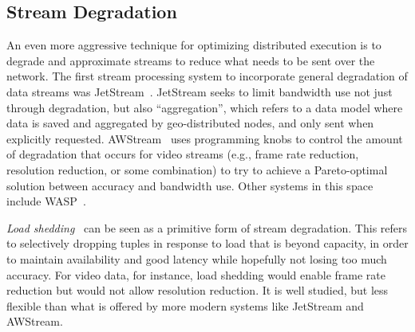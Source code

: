 \subsection{Stream Degradation}

An even more aggressive technique for optimizing distributed execution is to degrade and approximate streams to reduce what needs to be sent over the network.
The first stream processing system to incorporate general degradation of data streams was JetStream~\cite{rabkin2014jetstream}.
JetStream seeks to limit bandwidth use not just through degradation, but also ``aggregation'', which refers to a data model where data is saved and aggregated by geo-distributed nodes, and only sent when explicitly requested.
AWStream~\cite{zhang2018awstream} uses programming knobs to control the amount of degradation that occurs for video streams (e.g., frame rate reduction, resolution reduction, or some combination) to try to achieve a Pareto-optimal solution between accuracy and bandwidth use. Other systems in this space include WASP~\cite{jonathan2020wasp}.

\emph{Load shedding}~\cite{tatbul2003load,tatbul2007staying} can be seen as a primitive form of stream degradation.
This refers to selectively dropping tuples in response to load that is beyond capacity, in order to maintain availability and good latency while hopefully not losing too much accuracy.
For video data, for instance, load shedding would enable frame rate reduction but would not allow resolution reduction. It is well studied, but less flexible than what is offered by more modern systems like JetStream and AWStream.
